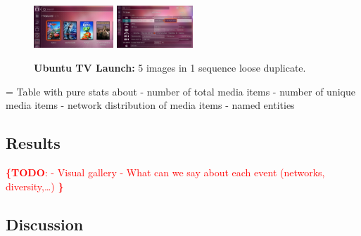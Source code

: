 \documentclass{acm_proc_article-sp}
\newcommand{\todo}[1]{\noindent\textcolor{red}{{\bf \{TODO}: #1{\bf \}}}}
\newenvironment{Todo}{\color{red}{\par{\bf TODO}}\everypar={\color{red}}{}}{}
\newcommand{\thumbheight}{16mm}
\newenvironment{thumbsequence}{}{\makebox[4mm]{}}
\begin{document}
\begin{figure}
\begin{centering}
\begin{thumbsequence}
		\includegraphics[height=\thumbheight]{resources/ubuntu/looseduplicate4.jpg}
		\includegraphics[height=\thumbheight]{resources/ubuntu/looseduplicate5.png}
	\end{thumbsequence}
	\caption{\textbf{Ubuntu TV Launch:} 5 images in 1 sequence loose duplicate.}
	\label{fig:ubuntutv}
\end{centering}
\end{figure}

\begin{Todo}
Table with pure stats about
- number of total media items
- number of unique media items
- network distribution of media items 
- named entities

\end{Todo}

\subsection{Results}
\todo{
- Visual gallery
- What can we say about each event (networks, diversity,…)
}

\subsection{Discussion}
\end{document}
